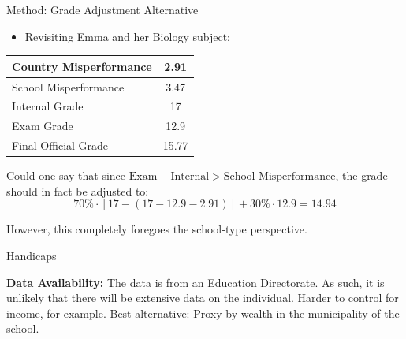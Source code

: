 \documentclass{beamer}
\begin{document}
\begin{frame}{Method: Grade Adjustment Alternative}
   
\begin{itemize}
    \item Revisiting Emma and her Biology subject:
\end{itemize}
    
\begin{table}[h!]
\centering
\begin{tabular}{|l|c|}
\hline
Country Misperformance & 2.91 \\ \hline
School Misperformance  & 3.47 \\ \hline
Internal Grade         & 17 \\ \hline
Exam Grade             & 12.9 \\ \hline
Final Official Grade   & 15.77 \\ \hline
\end{tabular}
\end{table} 

Could one say that since $\text{Exam}-\text{Internal}>\text{School Misperformance}$, the grade should in fact be adjusted to:
\[70\% \cdot [17-(17-12.9-2.91)]+30\% \cdot 12.9 = 14.94 \]

However, this completely foregoes the school-type perspective.
    
\end{frame}

\begin{frame}{Handicaps}

\textbf{Data Availability:} The data is from an Education Directorate. As such, it is unlikely that there will be extensive data on the individual. Harder to control for income, for example. Best alternative: Proxy by wealth in the municipality of the school.     
\end{frame}
\end{document}
